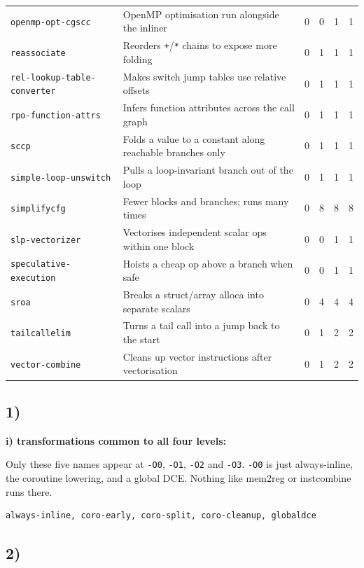 \documentclass[11pt,a4paper]{article}
\begin{document}
{\begin{longtable}{lp{6.4cm}rrrr}
\texttt{openmp-opt-cgscc} & OpenMP optimisation run alongside the inliner & 0 & 0 & 1 & 1 \\
\texttt{reassociate} & Reorders \texttt{+}/\texttt{*} chains to expose more folding & 0 & 1 & 1 & 1 \\
\texttt{rel-lookup-table-converter} & Makes switch jump tables use relative offsets & 0 & 1 & 1 & 1 \\
\texttt{rpo-function-attrs} & Infers function attributes across the call graph & 0 & 1 & 1 & 1 \\
\texttt{sccp} & Folds a value to a constant along reachable branches only & 0 & 1 & 1 & 1 \\
\texttt{simple-loop-unswitch} & Pulls a loop-invariant branch out of the loop & 0 & 1 & 1 & 1 \\
\texttt{simplifycfg} & Fewer blocks and branches; runs many times & 0 & 8 & 8 & 8 \\
\texttt{slp-vectorizer} & Vectorises independent scalar ops within one block & 0 & 0 & 1 & 1 \\
\texttt{speculative-execution} & Hoists a cheap op above a branch when safe & 0 & 0 & 1 & 1 \\
\texttt{sroa} & Breaks a struct/array alloca into separate scalars & 0 & 4 & 4 & 4 \\
\texttt{tailcallelim} & Turns a tail call into a jump back to the start & 0 & 1 & 2 & 2 \\
\texttt{vector-combine} & Cleans up vector instructions after vectorisation & 0 & 1 & 2 & 2 \\
\hline
\end{longtable}
}

\subsection*{1)}

\textbf{i) transformations common to all four levels:}

Only these five names appear at \texttt{-O0}, \texttt{-O1},
\texttt{-O2} and \texttt{-O3}. \texttt{-O0} is just always-inline, the
coroutine lowering, and a global DCE. Nothing like mem2reg or
instcombine runs there.

\begin{lstlisting}[language={}]
always-inline, coro-early, coro-split, coro-cleanup, globaldce
\end{lstlisting}

\subsection*{2)}
\end{document}
